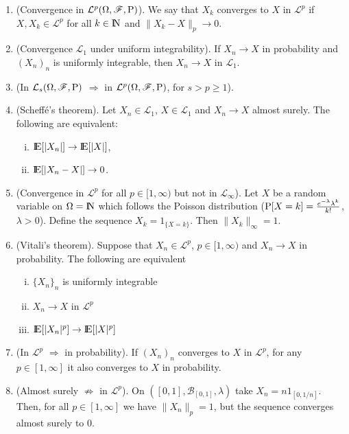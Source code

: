 \documentclass[a4paper,10pt]{scrbook}
\begin{document}
\begin{enumerate}        
 \item (Convergence in $\mathcal{L}^p(\Omega,\mathscr{F},\mathrm{P})$). We say that $X_k$ converges to $X$ in $\mathcal{L}^p$ 
       if $X,X_k\in\mathcal{L}^p$ for all $k\in\N$ and $\|X_k-X\|_p\to 0$.
 \item (Convergence $\mathcal{L}_1$ under uniform integrability). If $X_n \to X$ in probability and $(X_n)_n$ is uniformly
       integrable, then $X_n\to X$ in $\mathcal{L}_1$.
 \item (In $\mathcal{L}_s(\Omega,\mathscr{F},\mathrm{P})$ $\Rightarrow$ in $\mathcal{L}^p(\Omega,\mathscr{F},\mathrm{P})$, for $s>p\geq 1$). 
 \item (Scheff\'e's theorem). Let $X_n\in\mathcal{L}_1$, $X\in\mathcal{L}_1$ and $X_n\to X$ almost surely. The following are 
       equivalent:
       \begin{enumerate}[i.]
        \item $\E[|X_n|] \to \E[|X|]$,
        \item $\E[|X_n - X|]\to  0$.
       \end{enumerate} 
 \item (Convergence in $\mathcal{L}^p$ for all $p\in[1,\infty)$ but not in $\mathcal{L}_\infty$).
       Let $X$ be a random variable on $\Omega=\N$ which follows the Poisson distribution ($\mathrm{P}[X=k]=\frac{e^{-\lambda}\lambda^k}{k!}$, $\lambda>0$).
       Define the sequence $X_k = 1_{\{X=k\}}$. Then $\|X_k\|_\infty=1$.
 \item (Vitali's theorem).
       Suppose that $X_n\in\mathcal{L}^p$, $p\in[1,\infty)$ and $X_n\to X$ in probability.
       The following are equivalent
       \begin{enumerate}[i.]
        \item $\{X_n\}_n$ is uniformly integrable
        \item $X_n\to X$ in $\mathcal{L}^p$
        \item $\E[|X_n|^p] \to \E[|X|^p]$
       \end{enumerate}

 \item (In $\mathcal{L}^p$ $\Rightarrow$ in probability). If $(X_n)_n$ converges to $X$ in $\mathcal{L}^p$, for 
       any $p\in [1,\infty]$ it also converges to $X$ in probability. 
       
 \item (Almost surely $\not\Rightarrow$ in $\mathcal{L}^p$). On $([0,1], \mathcal{B}_{[0,1]}, \lambda)$ take $X_n=n 1_{[0,1/n]}$.
       Then, for all $p\in[1,\infty]$ we have $\|X_n\|_p=1$, but the sequence converges almost surely to $0$.
       

\end{enumerate}
\end{document}
